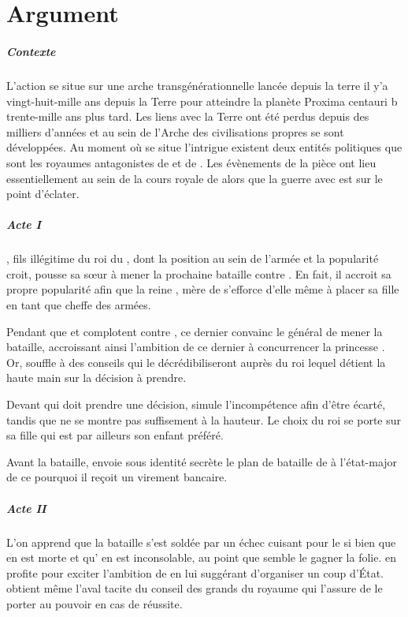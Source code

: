\chapter{Argument}

\paragraph{Contexte}
L’action se situe sur une arche transgénérationnelle lancée depuis la terre il y’a vingt-huit-mille ans depuis la Terre pour atteindre la planète Proxima centauri b trente-mille ans plus tard. Les liens avec la Terre ont été perdus depuis des milliers d’années et au sein de l’Arche des civilisations propres se sont développées. Au moment où se situe l’intrigue existent deux entités politiques que sont les royaumes antagonistes de \campprincipal{} et de \campoppose{}.
Les évènements de la pièce ont lieu essentiellement au sein de la cours royale de \campprincipal{} alors que la guerre avec \campoppose{} est sur le point d’éclater.

\paragraph{Acte I}
\elena{}, fils illégitime du roi du \campprincipal, dont la position au sein de l’armée et la popularité croit, pousse sa sœur \princesse{} à mener la prochaine bataille contre \campoppose{}. En fait, il accroit sa propre popularité afin que la reine \reine{}, mère de \princesse{}  s’efforce d’elle même à placer sa fille en tant que cheffe des armées.

Pendant que \reine{} et \princesse{} complotent contre \elena{},
ce dernier convainc le général \general{} de mener la bataille, accroissant ainsi l’ambition de ce dernier à concurrencer la princesse \princesse{}. Or, \elena{} souffle à \general{} des conseils qui le décrédibiliseront auprès du roi \roi{} lequel détient la haute main sur la décision à prendre.

Devant \roi{} qui doit prendre une décision, \elena{} simule l’incompétence afin d’être écarté, tandis que \general{} ne se montre pas suffisement à la hauteur. Le choix du roi se porte sur sa fille \princesse{} qui est par ailleurs son enfant préféré.

Avant la bataille, \elena{} envoie sous identité secrète le plan de bataille de \princesse{} à l’état-major de \campoppose{} ce pourquoi il reçoit un virement bancaire.

\paragraph{Acte II}
L’on apprend que la bataille s’est soldée par un échec cuisant pour le \campprincipal{} si bien que \princesse{} en est morte et qu’\roi{} en est inconsolable, au point que semble le gagner la folie. \elena{} en profite pour exciter l’ambition de \general{} en lui suggérant d’organiser un coup d’État. \general{} obtient même l’aval tacite du conseil des grands du royaume qui l’assure de le porter au pouvoir en cas de réussite.

